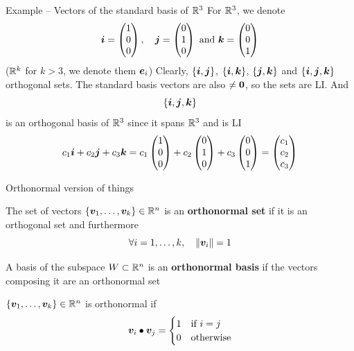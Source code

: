 \documentclass[aspectratio=169]{beamer}\usepackage[]{graphicx}\usepackage[]{xcolor}
\begin{document}
\begin{frame}{Example -- Vectors of the standard basis of $\mathbb{R}^3$}
For $\mathbb{R}^3$, we denote
\[
\bm{i} =\begin{pmatrix}
1\\0\\0
\end{pmatrix},\quad
\bm{j} =\begin{pmatrix}
0\\1\\0
\end{pmatrix}
\textrm{ and }
\bm{k} =\begin{pmatrix}
0\\0\\1
\end{pmatrix}
\]
($\mathbb{R}^k$ for $k>3$, we denote them $\bm{e}_i$)
\vfill
Clearly, $\{\bm{i},\bm{j}\}$, $\{\bm{i},\bm{k}\}$, $\{\bm{j},\bm{k}\}$ and $\{\bm{i},\bm{j},\bm{k}\}$ orthogonal sets. The standard basis vectors are also $\neq\b0$, so the sets are LI. And
\[
\{\bm{i},\bm{j},\bm{k}\}
\]
is an orthogonal basis of $\mathbb{R}^3$ since it spans $\mathbb{R}^3$ and is LI
\vfill
\[
c_1\bm{i}+c_2\bm{j}+c_3\bm{k}
=
c_1\begin{pmatrix}
1\\0\\0
\end{pmatrix}
+c_2\begin{pmatrix}
0\\1\\0
\end{pmatrix}
+c_3\begin{pmatrix}
0\\0\\1
\end{pmatrix}
=
\begin{pmatrix}
c_1\\c_2\\c_3
\end{pmatrix}
\]
\end{frame}

\begin{frame}{Orthonormal version of things}
\begin{definition}
The set of vectors $\{\bm{v}_1,\ldots,\bm{v}_k\}\in\mathbb{R}^n$ is an \textbf{orthonormal set} if it is an orthogonal set and furthermore
\[
\forall i=1,\ldots,k,\quad \|\bm{v}_i\|=1
\]
\end{definition}
\begin{definition}
A basis of the subspace $W\subset\mathbb{R}^n$ is an \textbf{orthonormal basis} if the vectors composing it are an orthonormal set
\end{definition}
\vfill
$\{\bm{v}_1,\ldots,\bm{v}_k\}\in\mathbb{R}^n$ is orthonormal if
\[
\bm{v}_i\bullet\bm{v}_j =
\begin{cases}
1 &\textrm{if }i=j \\
0 &\textrm{otherwise}
\end{cases}
\]
\end{frame}
\end{document}
